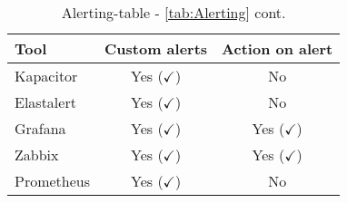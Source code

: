 \begin{table}[H]
	\centering
	\begin{tabular}{lcc}
		\hline
		Tool & Custom alerts & Action on alert \\
		\hline
		Kapacitor                    & Yes ($ \checkmark $)       & No\\
		Elastalert                   & Yes ($ \checkmark $) & No\\
		Grafana                      & Yes ($ \checkmark $)          & Yes ($ \checkmark $)\\
		Zabbix  & Yes ($ \checkmark $) & Yes ($ \checkmark $)\\
		Prometheus & Yes ($ \checkmark $) & No \\
		\hline 
	\end{tabular}
	\caption{Alerting-table - \cref{tab:Alerting} cont.}
	\label{tab:Alertingcont}
\end{table}

